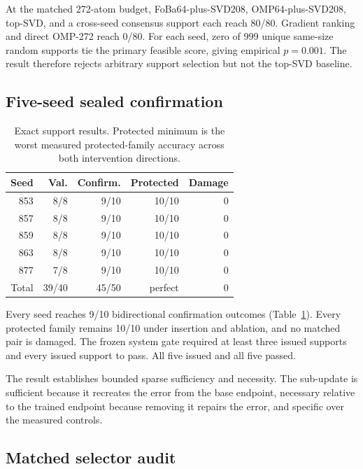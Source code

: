 \documentclass[10pt,twocolumn]{article}
\begin{document}
At the matched 272-atom budget, FoBa64-plus-SVD208, OMP64-plus-SVD208, top-SVD, and a cross-seed consensus support each reach 80/80. Gradient ranking and direct OMP-272 reach 0/80. For each seed, zero of 999 unique same-size random supports tie the primary feasible score, giving empirical $p=0.001$. The result therefore rejects arbitrary support selection but not the top-SVD baseline.

\subsection{Five-seed sealed confirmation}

\begin{table}[t]
\centering
\small
\caption{Exact support results. Protected minimum is the worst measured protected-family accuracy across both intervention directions.}
\label{tab:main}
\begin{tabular}{rrrrr}
\toprule
Seed & Val. & Confirm. & Protected & Damage \\
\midrule
853 & 8/8 & 9/10 & 10/10 & 0 \\
857 & 8/8 & 9/10 & 10/10 & 0 \\
859 & 8/8 & 9/10 & 10/10 & 0 \\
863 & 8/8 & 9/10 & 10/10 & 0 \\
877 & 7/8 & 9/10 & 10/10 & 0 \\
\midrule
Total & 39/40 & 45/50 & perfect & 0 \\
\bottomrule
\end{tabular}
\end{table}

Every seed reaches 9/10 bidirectional confirmation outcomes (Table~\ref{tab:main}). Every protected family remains 10/10 under insertion and ablation, and no matched pair is damaged. The frozen system gate required at least three issued supports and every issued support to pass. All five issued and all five passed.

The result establishes bounded sparse sufficiency and necessity. The sub-update is sufficient because it recreates the error from the base endpoint, necessary relative to the trained endpoint because removing it repairs the error, and specific over the measured controls.

\subsection{Matched selector audit}
\end{document}
